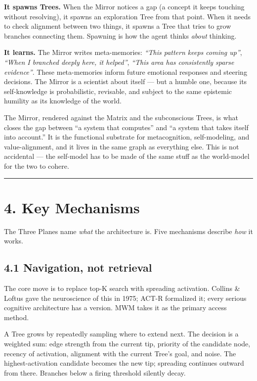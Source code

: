 \documentclass[12pt]{article}
\begin{document}
\textbf{It spawns Trees.} When the Mirror notices a gap (a concept it keeps touching without resolving), it spawns an exploration Tree from that point. When it needs to check alignment between two things, it spawns a Tree that tries to grow branches connecting them. Spawning is how the agent thinks \emph{about} thinking.

\textbf{It learns.} The Mirror writes meta-memories: \emph{``This pattern keeps coming up''}, \emph{``When I branched deeply here, it helped''}, \emph{``This area has consistently sparse evidence''}. These meta-memories inform future emotional responses and steering decisions. The Mirror is a scientist about itself --- but a humble one, because its self-knowledge is probabilistic, revisable, and subject to the same epistemic humility as its knowledge of the world.

The Mirror, rendered against the Matrix and the subconscious Trees, is what closes the gap between ``a system that computes'' and ``a system that takes itself into account.'' It is the functional substrate for metacognition, self-modeling, and value-alignment, and it lives in the same graph as everything else. This is not accidental --- the self-model has to be made of the same stuff as the world-model for the two to cohere.

\begin{center}\rule{0.5\linewidth}{0.5pt}\end{center}

\section{4. Key Mechanisms}\label{key-mechanisms}

The Three Planes name \emph{what} the architecture is. Five mechanisms describe \emph{how} it works.

\subsection{4.1 Navigation, not retrieval}\label{navigation-not-retrieval}

The core move is to replace top-K search with spreading activation. Collins \& Loftus gave the neuroscience of this in 1975; ACT-R formalized it; every serious cognitive architecture has a version. MWM takes it as the primary access method.

A Tree grows by repeatedly sampling where to extend next. The decision is a weighted sum: edge strength from the current tip, priority of the candidate node, recency of activation, alignment with the current Tree's goal, and noise. The highest-activation candidate becomes the new tip; spreading continues outward from there. Branches below a firing threshold silently decay.
\end{document}
